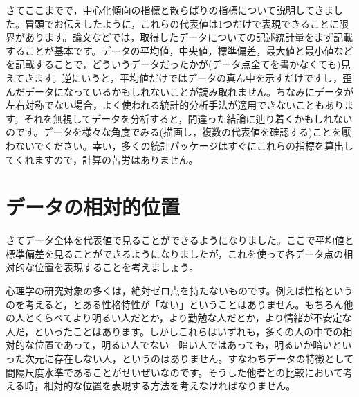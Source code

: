 \documentclass{ltjsbook}
\begin{document}
さてここまでで，中心化傾向の指標と散らばりの指標について説明してきました。冒頭でお伝えしたように，これらの代表値は1つだけで表現できることに限界があります。論文などでは，取得したデータについての記述統計量をまず記載することが基本です。データの平均値，中央値，標準偏差，最大値と最小値などを記載することで，どういうデータだったかが(データ点全てを書かなくても)見えてきます。逆にいうと，平均値だけではデータの真ん中を示すだけですし，歪んだデータになっているかもしれないことが読み取れません。ちなみにデータが左右対称でない場合，よく使われる統計的分析手法が適用できないこともあります。それを無視してデータを分析すると，間違った結論に辿り着くかもしれないのです。データを様々な角度でみる(描画し，複数の代表値を確認する)ことを厭わないでください。幸い，多くの統計パッケージはすぐにこれらの指標を算出してくれますので，計算の苦労はありません。

\section{データの相対的位置}
\label{zScore}
さてデータ全体を代表値で見ることができるようになりました。ここで平均値と標準偏差を見ることができるようになりましたが，これを使って各データ点の相対的な位置を表現することを考えましょう。

心理学の研究対象の多くは，絶対ゼロ点を持たないものです。例えば性格というのを考えると，とある性格特性が「ない」ということはありません。もちろん他の人とくらべてより明るい人だとか，より勤勉な人だとか，より情緒が不安定な人だ，といったことはあります。しかしこれらはいずれも，多くの人の中での相対的な位置であって，明るい人でない＝暗い人ではあっても，明るいか暗いといった次元に存在しない人，というのはありません。すなわちデータの特徴として間隔尺度水準であることがせいぜいなのです。そうした他者との比較において考える時，相対的な位置を表現する方法を考えなければなりません。
\end{document}
